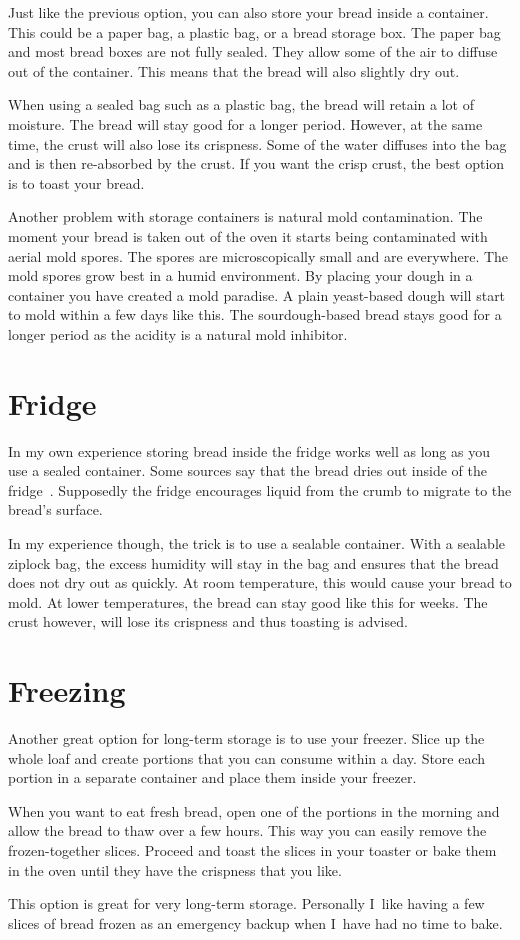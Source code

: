Just like the previous option, you can also store your
bread inside a container. This could be a paper bag, 
a plastic bag, or a bread storage box. The paper bag and
most bread boxes are not fully sealed. They allow some of
the air to diffuse out of the container. This means that
the bread will also slightly dry out.

When using a sealed bag such as a plastic bag, the bread
will retain a lot of moisture. The bread will stay good
for a longer period. However, at the same time, the crust
will also lose its crispness. Some of the water diffuses
into the bag and is then re-absorbed by the crust. If
you want the crisp crust, the best option is to toast your
bread.

Another problem with storage containers is natural
mold contamination. The moment your bread is taken out of
the oven it starts being contaminated with aerial mold spores.
The spores are microscopically small and are everywhere.
The mold spores grow best in a humid environment. By placing
your dough in a container you have created a mold paradise.
A plain yeast-based dough will start to mold within a few days
like this. The sourdough-based bread stays good
for a longer period as the acidity is a natural mold
inhibitor.

\section{Fridge}

In my own experience storing bread inside the fridge
works well as long as you use a sealed container. Some
sources say that the bread dries out inside of the
fridge~\cite{storing+bread}. Supposedly the fridge
encourages liquid from the crumb to migrate to the bread's surface.

In my experience though, the trick is to use a sealable
container. With a sealable ziplock bag,
the excess humidity will stay in the bag and ensures
that the bread does not dry out as quickly. At room
temperature, this would cause your bread to mold. At
lower temperatures, the bread can stay good like this for
weeks. The crust however, will lose its crispness and
thus toasting is advised.

\section{Freezing}

Another great option for long-term storage is to use
your freezer. Slice up the whole loaf and create portions
that you can consume within a day. Store each portion
in a separate container and place them inside your
freezer.

When you want to eat fresh bread, open one of the portions
in the morning and allow the bread to thaw over a few
hours. This way you can easily remove the frozen-together
slices. Proceed and toast the slices in your toaster
or bake them in the oven until they have the crispness
that you like.

This option is great for very long-term storage. Personally
I~like having a few slices of bread frozen as an emergency
backup when I~have had no time to bake.
